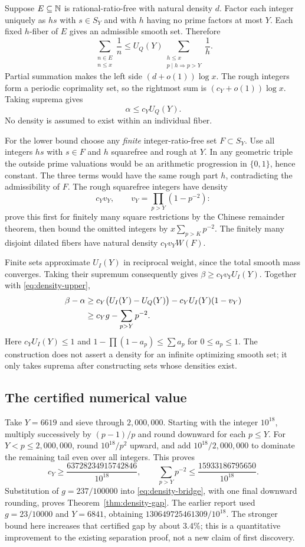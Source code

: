 Suppose $E\subseteq\mathbb N$ is rational-ratio-free with natural density $d$.
Factor each integer uniquely as $hs$ with $s\in S_Y$ and with $h$ having
no prime factors at most $Y$. Each fixed $h$-fiber of $E$ gives an admissible
smooth set. Therefore
\[
 \sum_{\substack{n\in E\\n\le x}}\frac1n
 \le U_Q(Y)\sum_{\substack{h\le x\\p\mid h\Rightarrow p>Y}}\frac1h.
\]
Partial summation makes the left side $(d+o(1))\log x$. The rough integers
form a periodic coprimality set, so the rightmost sum is
$(c_Y+o(1))\log x$. Taking suprema gives
\begin{equation}\label{eq:density-upper}
 \alpha\le c_Y U_Q(Y).
\end{equation}
No density is assumed to exist within an individual fiber.

For the lower bound choose any \emph{finite} integer-ratio-free set
$F\subset S_Y$. Use all integers $hs$ with $s\in F$ and $h$ squarefree
and rough at $Y$. In any geometric triple the outside prime valuations
would be an arithmetic progression in $\{0,1\}$, hence constant.
The three terms would have the same rough part $h$, contradicting the
admissibility of $F$. The rough squarefree integers have density
\[
 c_Yv_Y,\qquad v_Y=\prod_{p>Y}(1-p^{-2}):
\]
prove this first for finitely many square restrictions by the Chinese
remainder theorem, then bound the omitted integers by
$x\sum_{p>K}p^{-2}$. The finitely many disjoint dilated fibers have
natural density $c_Yv_Y W(F)$.

Finite sets approximate $U_I(Y)$ in reciprocal weight, since the total
smooth mass converges. Taking their supremum consequently gives
$\beta\ge c_Yv_Y U_I(Y)$. Together with \eqref{eq:density-upper},
\begin{align}
 \beta-\alpha
 &\ge c_Y\bigl(U_I(Y)-U_Q(Y)\bigr)
       -c_YU_I(Y)(1-v_Y)\notag\\
 &\ge c_Yg-\sum_{p>Y}p^{-2}.\label{eq:density-bridge}
\end{align}
Here $c_YU_I(Y)\le1$ and
$1-\prod(1-a_p)\le\sum a_p$ for $0\le a_p\le1$.
The construction does not assert a density for an infinite optimizing
smooth set; it only takes suprema after constructing sets whose densities exist.

\subsection{The certified numerical value}
Take $Y=6619$ and sieve through $2,000,000$. Starting with the integer
$10^{18}$, multiply successively by $(p-1)/p$ and round downward for each
$p\le Y$. For $Y<p\le2,000,000$, round $10^{18}/p^2$ upward, and add
$10^{18}/2,000,000$ to dominate the remaining tail even over all integers.
This proves
\[
 c_Y\ge\frac{63728234915742846}{10^{18}},\qquad
 \sum_{p>Y}p^{-2}\le\frac{15933186795650}{10^{18}}.
\]
Substitution of $g=237/100000$ into \eqref{eq:density-bridge}, with one
final downward rounding, proves Theorem~\ref{thm:density-gap}.
The earlier report used $g=23/10000$ and $Y=6841$, obtaining
$130649725461309/10^{18}$. The stronger bound here increases that
certified gap by about $3.4\%$; this is a quantitative improvement to the
existing separation proof, not a new claim of first discovery.

